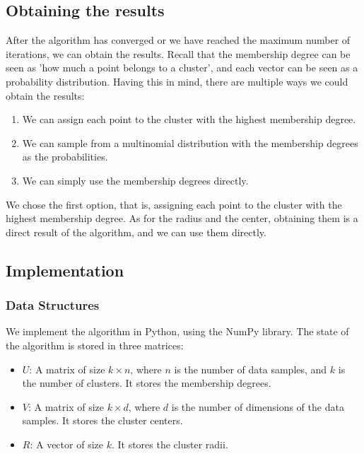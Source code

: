 \documentclass[conference]{IEEEtran}
\begin{document}
\subsection{Obtaining the results}
After the algorithm has converged or we have reached the maximum number of iterations, we can obtain the results.
Recall that the membership degree can be seen as 'how much a point belongs to a cluster', and each vector can be seen as a probability distribution.
Having this in mind, there are multiple ways we could obtain the results:
\begin{enumerate}
    \item We can assign each point to the cluster with the highest membership degree.
    \item We can sample from a multinomial distribution with the membership degrees as the probabilities.
    \item We can simply use the membership degrees directly.
\end{enumerate}
We chose the first option, that is, assigning each point to the cluster with the highest membership degree.
As for the radius and the center, obtaining them is a direct result of the algorithm, and we can use them directly.

\subsection{Implementation}
\subsubsection{Data Structures}
We implement the algorithm in Python, using the NumPy \cite{harris2020array} library. The state of the algorithm is stored in three matrices:
\begin{itemize}
    \item $U$: A matrix of size $k \times n$, where $n$ is the number of data samples, and $k$ is the number of clusters. It stores the membership degrees.
    \item $V$: A matrix of size $k \times d$, where $d$ is the number of dimensions of the data samples. It stores the cluster centers.
    \item $R$: A vector of size $k$. It stores the cluster radii.
\end{itemize}
\end{document}
